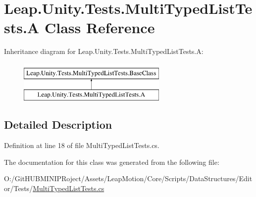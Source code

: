 \hypertarget{class_leap_1_1_unity_1_1_tests_1_1_multi_typed_list_tests_1_1_a}{}\section{Leap.\+Unity.\+Tests.\+Multi\+Typed\+List\+Tests.\+A Class Reference}
\label{class_leap_1_1_unity_1_1_tests_1_1_multi_typed_list_tests_1_1_a}
Inheritance diagram for Leap.\+Unity.\+Tests.\+Multi\+Typed\+List\+Tests.\+A\+:\begin{figure}[H]
\begin{center}
\leavevmode
\includegraphics[height=2.000000cm]{class_leap_1_1_unity_1_1_tests_1_1_multi_typed_list_tests_1_1_a}
\end{center}
\end{figure}


\subsection{Detailed Description}


Definition at line 18 of file Multi\+Typed\+List\+Tests.\+cs.



The documentation for this class was generated from the following file\+:\begin{DoxyCompactItemize}
\item 
O\+:/\+Git\+H\+U\+B\+M\+I\+N\+I\+P\+Roject/\+Assets/\+Leap\+Motion/\+Core/\+Scripts/\+Data\+Structures/\+Editor/\+Tests/\mbox{\hyperlink{_multi_typed_list_tests_8cs}{Multi\+Typed\+List\+Tests.\+cs}}\end{DoxyCompactItemize}
